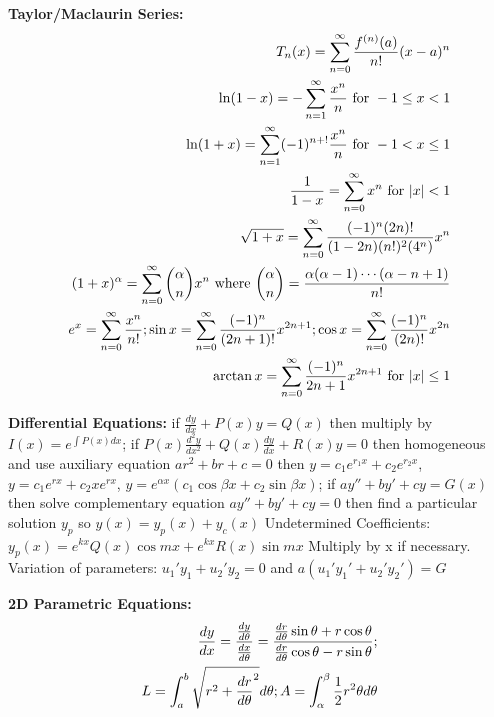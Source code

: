 \documentclass[twoside,draft]{article}
\begin{document}
\begin{multicols}{3}
  \textbf{Taylor/Maclaurin Series:}
  \begin{align*}
    T_n(x) = \sum_{n=0}^{\infty} \frac{f^{(n)}(a)}{n!}(x-a)^n \\
    \ln(1-x) = -\sum_{n=1}^{\infty} \frac{x^n}{n} \text{ for } -1\leq x < 1 \\
    \ln(1+x) = \sum_{n=1}^{\infty} (-1)^{n+!} \frac{x^n}{n} \text{ for } -1 < x\leq 1 \\
    \frac{1}{1-x} = \sum_{n=0}^{\infty} x^n \text{ for } |x| < 1 \\
    \sqrt{1+x} = \sum_{n=0}^{\infty} \frac{(-1)^n(2n)!}{(1-2n)(n!)^2(4^n)}x^n \\
    (1+x)^{\alpha} = \sum_{n=0}^{\infty} {\alpha \choose n} x^n \text{ where } {\alpha \choose n} = {\alpha(\alpha-1)\cdots(\alpha-n+1) \over n!} \\
    e^x = \sum_{n=0}^{\infty} \frac{x^n}{n!};
    \sin x = \sum_{n=0}^{\infty} \frac{(-1)^n}{(2n+1)!}x^{2n+1};
    \cos x = \sum_{n=0}^{\infty} \frac{(-1)^n}{(2n)!}x^{2n} \\
    \arctan x = \sum_{n=0}^{\infty} \frac{(-1)^n}{2n+1}x^{2n+1} \text{ for } |x| \leq 1
  \end{align*}

  \textbf{Differential Equations:}
  if $\frac{dy}{dx} + P(x)y = Q(x)$ then multiply by $I(x) = e^{\int P(x) dx}$;
  if $P(x)\frac{d^2y}{dx^2} + Q(x)\frac{dy}{dx} + R(x)y = 0$ then homogeneous and use
  auxiliary equation $ar^2 + br + c = 0$ then
  $y = c_1e^{r_1x} + c_2e^{r_2x}$,
  $y = c_1e^{rx} + c_2xe^{rx}$,
  $y = e^{\alpha x}(c_1 \cos \beta x + c_2 \sin \beta x)$;
  if $ay'' + by' + cy = G(x)$ then solve complementary equation $ay'' + by' + cy = 0$
  then find a particular solution $y_p$ so $y(x) = y_p(x) + y_c(x)$
  Undetermined Coefficients:
  $y_p(x) = e^{kx}Q(x)\cos m x + e^{kx}R(x)\sin mx$ Multiply by x if necessary.
  Variation of parameters:
  $u_1'y_1 + u_2'y_2 = 0$ and $a(u_1'y_1' + u_2'y_2') = G$

  \textbf{2D Parametric Equations:}
  \begin{align*}
    \frac{dy}{dx} = \frac{\frac{dy}{d\theta}}{\frac{dx}{d\theta}} =
    \frac{\frac{dr}{d\theta} \sin \theta + r \cos \theta}{\frac{dr}{d\theta} \cos \theta - r \sin \theta}; \\
    L = \int_a^b \sqrt{r^2 + {dr \over d\theta}^2} d\theta;
    A = \int_{\alpha}^{\beta} {1 \over 2} r^2 \theta d\theta
  \end{align*}


\end{multicols}
\end{document}
